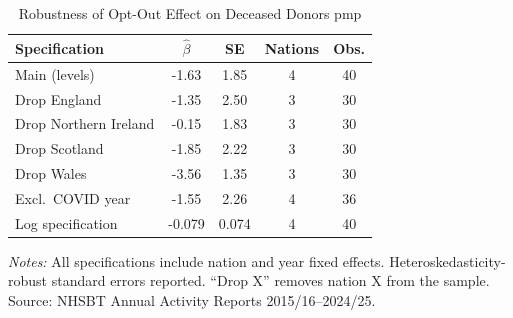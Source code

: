 \begin{table}[htbp]
\centering
\caption{Robustness of Opt-Out Effect on Deceased Donors pmp}
\label{tab:robust}
\begin{threeparttable}
\begin{tabular}{lcccc}
\toprule
Specification & $\hat{\beta}$ & SE & Nations & Obs. \\
\midrule
Main (levels) & -1.63 & 1.85 & 4 & 40 \\
Drop England & -1.35 & 2.50 & 3 & 30 \\
Drop Northern Ireland & -0.15 & 1.83 & 3 & 30 \\
Drop Scotland & -1.85 & 2.22 & 3 & 30 \\
Drop Wales & -3.56 & 1.35 & 3 & 30 \\
Excl.\ COVID year & -1.55 & 2.26 & 4 & 36 \\
Log specification & -0.079 & 0.074 & 4 & 40 \\
\bottomrule
\end{tabular}
\begin{tablenotes}[flushleft]\footnotesize
\item \textit{Notes:} All specifications include nation and year fixed effects. Heteroskedasticity-robust standard errors reported. ``Drop X'' removes nation X from the sample. Source: NHSBT Annual Activity Reports 2015/16--2024/25.
\end{tablenotes}
\end{threeparttable}
\end{table}
